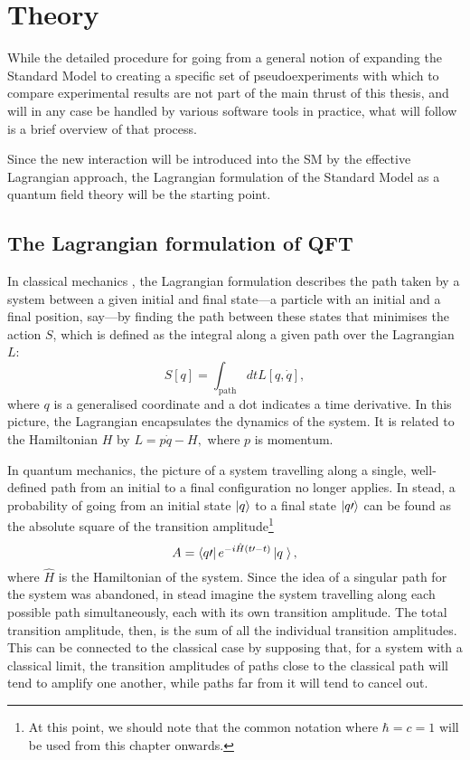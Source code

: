 \chapter{Theory}\label{ch.theory}

While the detailed procedure for going from a general notion of expanding the Standard Model to creating a specific set of pseudoexperiments with which to compare experimental results are not part of the main thrust of this thesis, and will in any case be handled by various software tools in practice, what will follow is a brief overview of that process.

Since the new interaction will be introduced into the SM by the effective Lagrangian approach, the Lagrangian formulation of the Standard Model as a quantum field theory will be the starting point.

\section{The Lagrangian formulation of QFT}
In classical mechanics \cite{goldstein}, the Lagrangian formulation describes the path taken by a system between a given initial and final state---a particle with an initial and a final position, say---by finding the path between these states that minimises the action $S$, which is defined as the integral along a given path over the Lagrangian $L$:
\[S[q]=\int_\textrm{path}dtL[q,\dot{q}],\]
where $q$ is a generalised coordinate and a dot indicates a time derivative. In this picture, the Lagrangian encapsulates the dynamics of the system. It is related to the Hamiltonian $H$ by
\(L = p\dot q- H,\label{htol}\)
where $p$ is momentum.

In quantum mechanics, the picture of a system travelling along a single, well-defined path from an initial to a final configuration no longer applies. In stead, a probability of going from an initial state $\left| q \right\rangle$ to a final state $\left| q\prime \right\rangle$ can be found as the absolute square of the transition amplitude\footnote{At this point, we should note that the common notation where $\hbar = c = 1$ will be used from this chapter onwards.} \cite{srednicki}
\[A=\bra{q\prime}e^{-i\hat H(t\prime-t)}\ket{q\phantom\prime},\]
where $\hat H$ is the Hamiltonian of the system. Since the idea of a singular path for the system was abandoned, in stead imagine the system travelling along each possible path simultaneously, each with its own transition amplitude. The total transition amplitude, then, is the sum of all the individual transition amplitudes. This can be connected to the classical case by supposing that, for a system with a classical limit, the transition amplitudes of paths close to the classical path will tend to amplify one another, while paths far from it will tend to cancel out.

